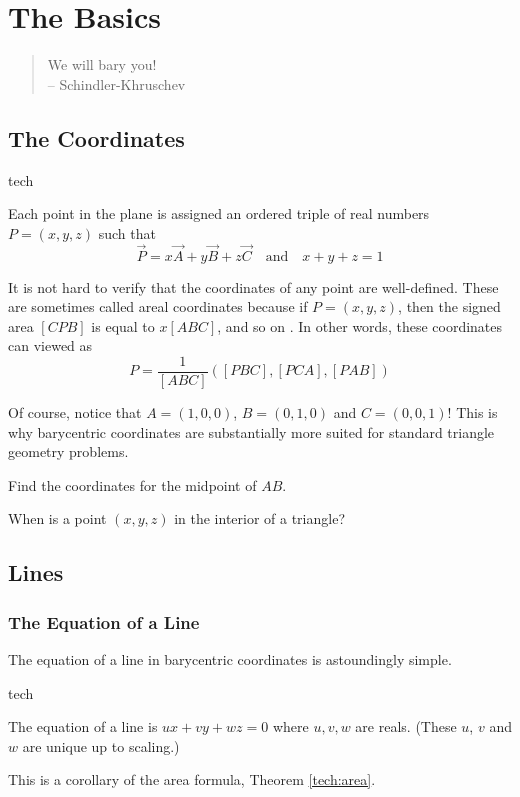 \chapter{The Basics}
\begin{quote}
  We will bary you!
  \\ -- Schindler-Khruschev
\end{quote}

\section{The Coordinates}
\begin{StoreCode}{tech}
\begin{definition}
  Each point in the plane is assigned an ordered triple of real numbers $P = (x,y,z)$ such that \[ \vec P = x \vec A + y \vec B + z \vec C \quad \text{and} \quad x+y+z = 1 \]
\end{definition}
\end{StoreCode}

It is not hard to verify that the coordinates of any point are well-defined.  These are sometimes called areal coordinates because if $P=(x,y,z)$, then the signed area $[CPB]$ is equal to $x[ABC]$, and so on \cite{infinity,abel}.  In other words, these coordinates can viewed as \[ P = \frac{1}{[ABC]}([PBC], [PCA], [PAB]) \]

Of course, notice that $A=(1,0,0)$, $B=(0,1,0)$ and $C=(0,0,1)$!  This is why barycentric coordinates are substantially more suited for standard triangle geometry problems.

\begin{exercise}
  Find the coordinates for the midpoint of $AB$.
\end{exercise}
\begin{exercise}
  When is a point $(x,y,z)$ in the interior of a triangle?
\end{exercise}


\section{Lines}
\subsection{The Equation of a Line}
The equation of a line \cite{infinity,abel} in barycentric coordinates is astoundingly simple.
\begin{StoreCode}{tech}
\begin{theorem}[Line]
  \label{tech:line}
  The equation of a line is $ux+vy+wz = 0$ where $u,v,w$ are reals.  (These $u$, $v$ and $w$ are unique up to scaling.)
\end{theorem}
\end{StoreCode}
This is a corollary of the area formula, Theorem \ref{tech:area}.

